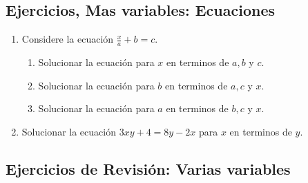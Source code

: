 \newpage
\begin{center}
	\vspace{-5mm}
	\subsection*{Ejercicios, Mas variables: Ecuaciones}\label{ejercicios_section_ecuaciones}
\end{center}

\begin{enumerate}
	\item Considere la ecuación $\frac{x}{a}+b=c$.
	\begin{enumerate}[label=\Alph*)]
		\item Solucionar la ecuación para $x$ en terminos de $a,b$ y $c$.
		\item Solucionar la ecuación para $b$ en terminos de $a,c$ y $x$.
		\item Solucionar la ecuación para $a$ en terminos de $b,c$ y $x$.										
	\end{enumerate}
	
	\item Solucionar la ecuación $3xy+4=8y-2x$ para $x$ en terminos de $y$.	
	
\end{enumerate}
\newpage


\newpage
\begin{center}
	\vspace{-5mm}
	\section*{Ejercicios de Revisión: Varias variables}\label{ejercicios_chapter_varias_variables}
\end{center}

